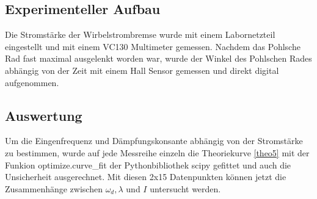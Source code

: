 \documentclass[11pt, a4paper]{article}
\begin{document}
    \subsection{Experimenteller Aufbau}
    Die Stromstärke der Wirbelstrombremse wurde mit einem Labornetzteil eingestellt und
    mit einem VC130 Multimeter gemessen. Nachdem das Pohlsche Rad fast maximal ausgelenkt worden war, 
    wurde der Winkel des Pohlschen Rades abhängig von der Zeit
    mit einem Hall Sensor gemessen und direkt digital aufgenommen.

    \subsection{Auswertung}
    Um die Eingenfrequenz und Dämpfungskonsante abhängig von der Stromstärke zu bestimmen,
    wurde auf jede Messreihe einzeln die Theoriekurve \ref{theo5} mit
    der Funkion \textsf{optimize.curve\_fit} der Pythonbibliothek scipy
    gefittet und auch die Unsicherheit ausgerechnet. Mit diesen 2x15 Datenpunkten können jetzt die Zusammenhänge
    zwischen $\omega_d, \lambda$ und $I$ untersucht werden.
\end{document}
